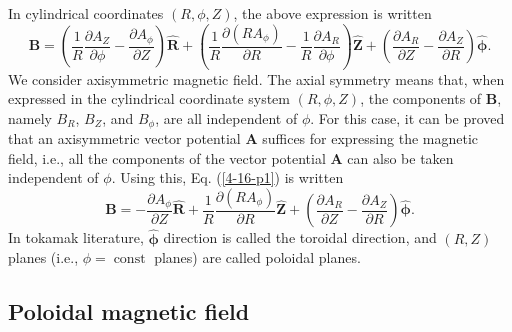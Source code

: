 \documentclass{llncs}
\newcommand{\tmmathbf}[1]{\ensuremath{\boldsymbol{#1}}}
\newcommand{\tmop}[1]{\ensuremath{\operatorname{#1}}}
\begin{document}
In cylindrical coordinates $(R, \phi, Z)$, the above expression is written
\begin{equation}
  \label{4-16-p1} \mathbf{B}= \left( \frac{1}{R} \frac{\partial A_Z}{\partial
  \phi} - \frac{\partial A_{\phi}}{\partial Z} \right) \hat{\mathbf{R}} +
  \left( \frac{1}{R} \frac{\partial (R A_{\phi})}{\partial R} - \frac{1}{R}
  \frac{\partial A_R}{\partial \phi} \right) \hat{\mathbf{Z}} + \left(
  \frac{\partial A_R}{\partial Z} - \frac{\partial A_Z}{\partial R} \right)
  \hat{\tmmathbf{\phi}} .
\end{equation}
We consider axisymmetric magnetic field. The axial symmetry means that, when
expressed in the cylindrical coordinate system $(R, \phi, Z)$, the components
of $\mathbf{B}$, namely $B_R$, $B_Z$, and $B_{\phi}$, are all independent of
$\phi$. For this case, it can be proved that an axisymmetric vector potential
$\mathbf{A}$ suffices for expressing the magnetic field, i.e., all the
components of the vector potential $\mathbf{A}$ can also be taken independent
of $\phi$. Using this, Eq. (\ref{4-16-p1}) is written
\begin{equation}
  \label{9-6-p1} \mathbf{B}= - \frac{\partial A_{\phi}}{\partial Z}
  \hat{\mathbf{R}} + \frac{1}{R} \frac{\partial (R A_{\phi})}{\partial R}
  \hat{\mathbf{Z}} + \left( \frac{\partial A_R}{\partial Z} - \frac{\partial
  A_Z}{\partial R} \right) \hat{\tmmathbf{\phi}} .
\end{equation}
In tokamak literature, $\hat{\tmmathbf{\phi}}$ direction is called the
toroidal direction, and $(R, Z)$ planes (i.e., $\phi = \tmop{const}$ planes)
are called poloidal planes.

\subsection{Poloidal magnetic field}
\end{document}
